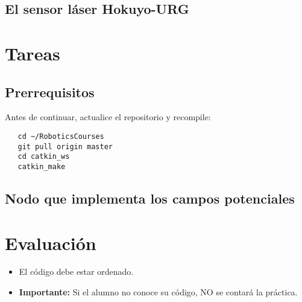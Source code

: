 \documentclass[letterpaper,12pt]{article}
\begin{document}
\subsection{El sensor láser Hokuyo-URG}

\section{Tareas}

\subsection{Prerrequisitos}
Antes de continuar, actualice el repositorio y recompile:
\begin{verbatim}
   cd ~/RoboticsCourses
   git pull origin master
   cd catkin_ws
   catkin_make
\end{verbatim}


\subsection{Nodo que implementa los campos potenciales}

\section{Evaluación}
\begin{itemize}
\item El código debe estar ordenado.
\item \textbf{Importante: } Si el alumno no conoce su código, NO se contará la práctica.
\end{itemize}
\end{document}
